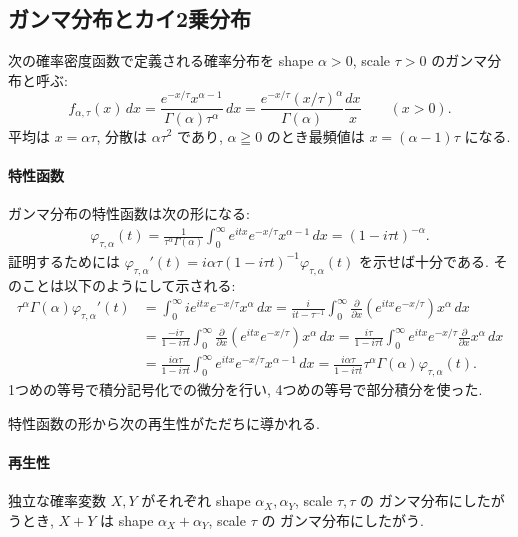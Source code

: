 \documentclass[12pt,twoside]{jarticle}
\renewcommand\d{\partial}
\theoremstyle{jplain}
\theoremstyle{jplain}
\theoremstyle{jplain}
\numberwithin{theorem}{section}
\numberwithin{equation}{section}
\numberwithin{figure}{section}
\numberwithin{table}{section}
\begin{document}

\subsection{ガンマ分布とカイ2乗分布}
\label{sec:Gamma}

次の確率密度函数で定義される確率分布を
shape $\alpha>0$, scale $\tau>0$ のガンマ分布と呼ぶ:
\[
f_{\alpha,\tau}(x)\,dx
=\frac{e^{-x/\tau}x^{\alpha-1}}{\Gamma(\alpha)\tau^\alpha}\,dx
=\frac{e^{-x/\tau}(x/\tau)^\alpha}{\Gamma(\alpha)}\frac{dx}{x}
\qquad (x>0).
\]
平均は $x=\alpha\tau$, 分散は $\alpha\tau^2$ であり, 
$\alpha\geqq 0$ のとき最頻値は $x=(\alpha-1)\tau$ になる.

\paragraph{特性函数}
ガンマ分布の特性函数は次の形になる:
\begin{align*}
\varphi_{\tau,\alpha}(t)
=\frac{1}{\tau^\alpha\Gamma(\alpha)}\int_0^\infty e^{itx}e^{-x/\tau}x^{\alpha-1}\,dx  
=(1-i\tau t)^{-\alpha}.
\end{align*}
証明するためには $\varphi_{\tau,\alpha}'(t)=i\alpha\tau(1-i\tau t)^{-1}\varphi_{\tau,\alpha}(t)$
を示せば十分である. そのことは以下のようにして示される:
\begin{align*}
\tau^\alpha\Gamma(\alpha)\varphi_{\tau,\alpha}'(t)
&
=\int_0^\infty i e^{itx} e^{-x/\tau} x^\alpha\,dx
= \frac{i}{it-\tau^{-1}}
\int_0^\infty \frac{\d}{\d x}(e^{itx} e^{-x/\tau}) x^\alpha\,dx
\\ &
=\frac{-i\tau}{1-i\tau t} 
\int_0^\infty \frac{\d}{\d x}(e^{itx} e^{-x/\tau}) x^\alpha\,dx
=\frac{i\tau}{1-i\tau t}
\int_0^\infty  e^{itx} e^{-x/\tau} \frac{\d}{\d x}x^\alpha\,dx
\\ &
=\frac{i\alpha\tau}{1-i\tau t}
\int_0^\infty  e^{itx} e^{-x/\tau} x^{\alpha-1}\,dx
=\frac{i\alpha\tau}{1-i\tau t}
\tau^\alpha\Gamma(\alpha)\varphi_{\tau,\alpha}(t).
\end{align*}
1つめの等号で積分記号化での微分を行い, 
4つめの等号で部分積分を使った.

特性函数の形から次の再生性がただちに導かれる.

\paragraph{再生性}
独立な確率変数 $X,Y$ がそれぞれ shape $\alpha_X,\alpha_Y$, scale $\tau,\tau$ の
ガンマ分布にしたがうとき, $X+Y$ は shape $\alpha_X+\alpha_Y$, scale $\tau$ の
ガンマ分布にしたがう.
\end{document}
